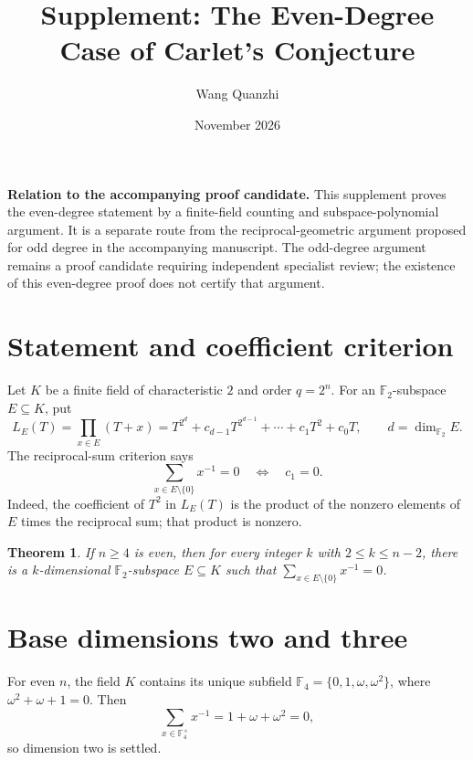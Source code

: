 \documentclass[11pt]{amsart}
\title{Supplement: The Even-Degree Case of Carlet's Conjecture}
\author{Wang Quanzhi}
\date{November 2026}
\newtheorem{theorem}{Theorem}
\begin{document}
\maketitle

\noindent\textbf{Relation to the accompanying proof candidate.} This supplement proves the even-degree statement by a finite-field counting and subspace-polynomial argument. It is a separate route from the reciprocal-geometric argument proposed for odd degree in the accompanying manuscript. The odd-degree argument remains a proof candidate requiring independent specialist review; the existence of this even-degree proof does not certify that argument.

\section{Statement and coefficient criterion}
Let $K$ be a finite field of characteristic $2$ and order $q=2^n$. For an $\mathbb F_2$-subspace $E\subseteq K$, put
\[
L_E(T)=\prod_{x\in E}(T+x)=T^{2^d}+c_{d-1}T^{2^{d-1}}+\cdots+c_1T^2+c_0T,
\qquad d=\dim_{\mathbb F_2}E.
\]
The reciprocal-sum criterion says
\[
\sum_{x\in E\setminus\{0\}}x^{-1}=0\quad\Longleftrightarrow\quad c_1=0.
\]
Indeed, the coefficient of $T^2$ in $L_E(T)$ is the product of the nonzero elements of $E$ times the reciprocal sum; that product is nonzero.

\begin{theorem}
If $n\ge4$ is even, then for every integer $k$ with $2\le k\le n-2$, there is a $k$-dimensional $\mathbb F_2$-subspace $E\subseteq K$ such that $\sum_{x\in E\setminus\{0\}}x^{-1}=0$.
\end{theorem}

\section{Base dimensions two and three}
For even $n$, the field $K$ contains its unique subfield $\mathbb F_4=\{0,1,\omega,\omega^2\}$, where $\omega^2+\omega+1=0$. Then
\[
\sum_{x\in\mathbb F_4^\times}x^{-1}=1+\omega+\omega^2=0,
\]
so dimension two is settled.
\end{document}
